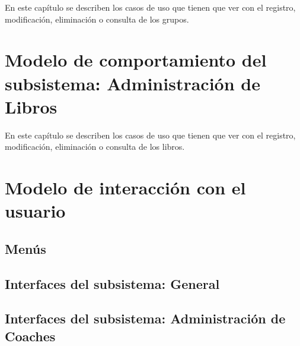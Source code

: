 \documentclass[10pt]{book}
\begin{document}
	En este capítulo se describen los casos de uso que tienen que ver con el registro, modificación, eliminación o consulta de los grupos.\bigskip





\chapter{Modelo de comportamiento del subsistema: Administración de Libros}
\label{chp:administracionLibros}

	En este capítulo se describen los casos de uso que tienen que ver con el registro, modificación, eliminación o consulta de los libros.\bigskip





\chapter{Modelo de interacción con el usuario}\label{chp:modeloInteraccionUsuario}

\section{Menús}
\section{Interfaces del subsistema: General}

\section{Interfaces del subsistema: Administración de Coaches}

\end{document}
